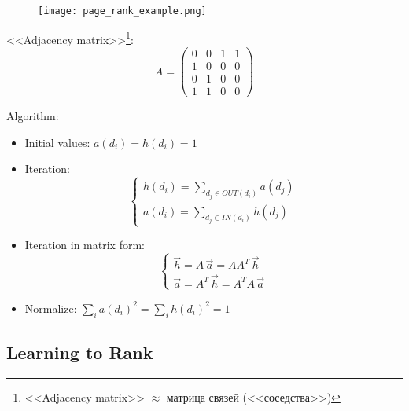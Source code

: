 \begin{multicols}{2}
\begin{figure}[H]
    \centering
    \texttt{[image: page\_rank\_example.png]}
\end{figure}


<<Adjacency matrix>>\footnote{<<Adjacency matrix>> $\approx$ матрица связей (<<соседства>>)}:
\begin{equation*}
A = 
\begin{pmatrix}
 0  &  0  &  1  &  1 \\
 1  &  0  &  0  &  0 \\
 0  &  1  &  0  &  0 \\
 1  &  1  &  0  &  0 
\end{pmatrix}
\end{equation*}


Algorithm:
\begin{itemize}
\item Initial values: $a(d_i)=h(d_i)=1$
\item Iteration:
\begin{equation*}
\begin{cases}
h(d_i) = \sum_{d_j \in OUT(d_i)} a(d_j) \\
a(d_i) = \sum_{d_j \in IN(d_i)} h(d_j)
\end{cases}
\end{equation*}
\item Iteration in matrix form:
\begin{equation*}
\begin{cases}
\vec{h} = A\,\vec{a} = AA^T\,\vec{h} \\
\vec{a} = A^T\,\vec{h} = A^TA\,\vec{a}
\end{cases}
\end{equation*}
\item Normalize: $\sum_i a(d_i)^2 = \sum_i h(d_i)^2 = 1$
\end{itemize}

\end{multicols}


\subsection{Learning to Rank}

